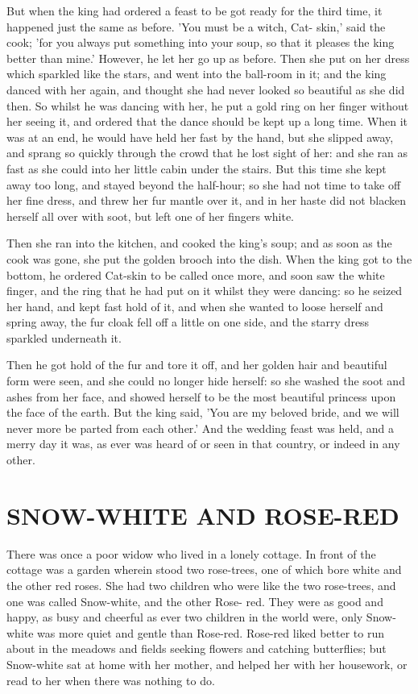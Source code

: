 \documentclass[12pt]{book}
\begin{document}
But when the king had ordered a feast to be got ready for the third
time, it happened just the same as before. 'You must be a witch, Cat-
skin,' said the cook; 'for you always put something into your soup, so
that it pleases the king better than mine.' However, he let her go up
as before. Then she put on her dress which sparkled like the stars,
and went into the ball-room in it; and the king danced with her again,
and thought she had never looked so beautiful as she did then. So
whilst he was dancing with her, he put a gold ring on her finger
without her seeing it, and ordered that the dance should be kept up a
long time. When it was at an end, he would have held her fast by the
hand, but she slipped away, and sprang so quickly through the crowd
that he lost sight of her: and she ran as fast as she could into her
little cabin under the stairs. But this time she kept away too long,
and stayed beyond the half-hour; so she had not time to take off her
fine dress, and threw her fur mantle over it, and in her haste did not
blacken herself all over with soot, but left one of her fingers white.

Then she ran into the kitchen, and cooked the king's soup; and as soon
as the cook was gone, she put the golden brooch into the dish. When
the king got to the bottom, he ordered Cat-skin to be called once
more, and soon saw the white finger, and the ring that he had put on
it whilst they were dancing: so he seized her hand, and kept fast hold
of it, and when she wanted to loose herself and spring away, the fur
cloak fell off a little on one side, and the starry dress sparkled
underneath it.

Then he got hold of the fur and tore it off, and her golden hair and
beautiful form were seen, and she could no longer hide herself: so she
washed the soot and ashes from her face, and showed herself to be the
most beautiful princess upon the face of the earth. But the king said,
'You are my beloved bride, and we will never more be parted from each
other.' And the wedding feast was held, and a merry day it was, as
ever was heard of or seen in that country, or indeed in any other.



\chapter{SNOW-WHITE AND ROSE-RED}

There was once a poor widow who lived in a lonely cottage. In front of
the cottage was a garden wherein stood two rose-trees, one of which
bore white and the other red roses. She had two children who were like
the two rose-trees, and one was called Snow-white, and the other Rose-
red. They were as good and happy, as busy and cheerful as ever two
children in the world were, only Snow-white was more quiet and gentle
than Rose-red. Rose-red liked better to run about in the meadows and
fields seeking flowers and catching butterflies; but Snow-white sat at
home with her mother, and helped her with her housework, or read to
her when there was nothing to do.
\end{document}
